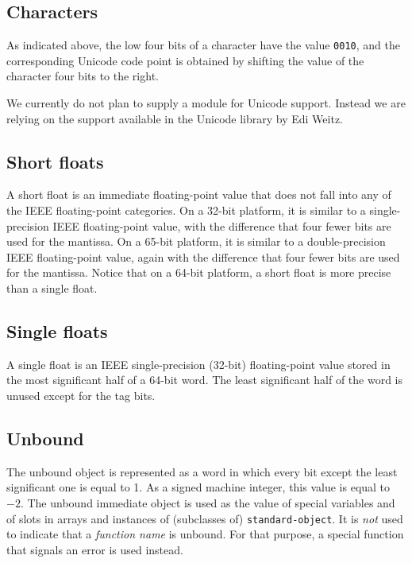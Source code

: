 \subsection{Characters}

As indicated above, the low four bits of a character have the value
\texttt{0010}, and the corresponding Unicode code point is obtained by
shifting the value of the character four bits to the right. 

We currently do not plan to supply a module for Unicode support.
Instead we are relying on the support available in the Unicode library
by Edi Weitz.

\subsection{Short floats}

A short float is an immediate floating-point value that does not fall
into any of the IEEE floating-point categories.  On a 32-bit platform,
it is similar to a single-precision IEEE floating-point value, with
the difference that four fewer bits are used for the mantissa.  On a
65-bit platform, it is similar to a double-precision IEEE
floating-point value, again with the difference that four fewer bits
are used for the mantissa.  Notice that on a 64-bit platform, a short
float is more precise than a single float. 

\subsection{Single floats}

A single float is an IEEE single-precision (32-bit) floating-point
value stored in the most significant half of a 64-bit word.  The least
significant half of the word is unused except for the tag bits. 

\subsection{Unbound}
\label{data-representation-unbound}

The unbound object is represented as a word in which every bit except
the least significant one is equal to 1.  As a signed machine integer,
this value is equal to $-2$.  The unbound immediate object is used
as the value of special variables and of slots in arrays and instances
of (subclasses of) \texttt{standard-object}.  It is \emph{not} used to
indicate that a \emph{function name} is unbound.  For that purpose, a
special function that signals an error is used instead. 

